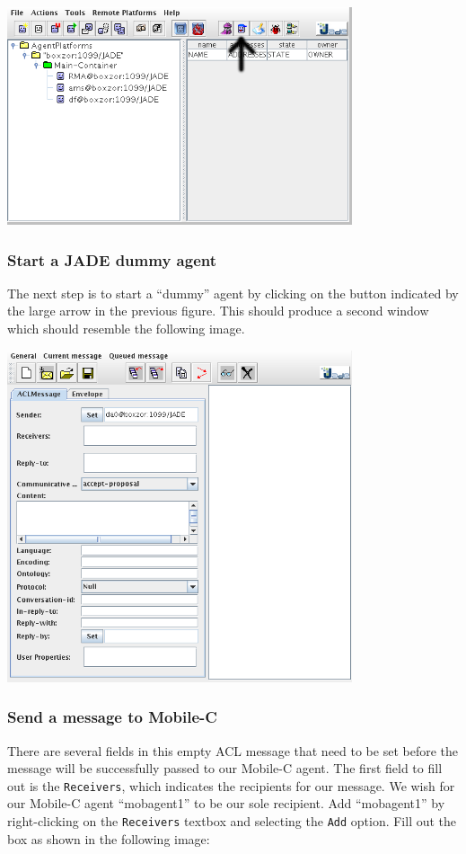 \documentclass[11pt]{report}
\begin{document}
{\begin{center}
\includegraphics[width=4in]{figure/jade_to_mc_example/jade_main_window.png}
\end{center}

\subsubsection{Start a JADE dummy agent}
The next step is to start a ``dummy'' agent by clicking on the button indicated by the 
large arrow in the previous figure. This should produce a second window
which should resemble the following image.

\begin{center}
\includegraphics[width=4in]{figure/jade_to_mc_example/dummy_agent_window_blank.png}
\end{center}

\subsubsection{Send a message to Mobile-C}
There are several fields in this empty ACL message that need to be set before the
message will be successfully passed to our Mobile-C agent. The first field to fill
out is the \texttt{Receivers}, which indicates the recipients for our message.
We wish for our Mobile-C agent ``mobagent1'' to be our sole recipient. Add 
``mobagent1'' by right-clicking on the \texttt{Receivers} textbox and selecting the
\texttt{Add} option. Fill out the box as shown in the following image:

}
\end{document}

